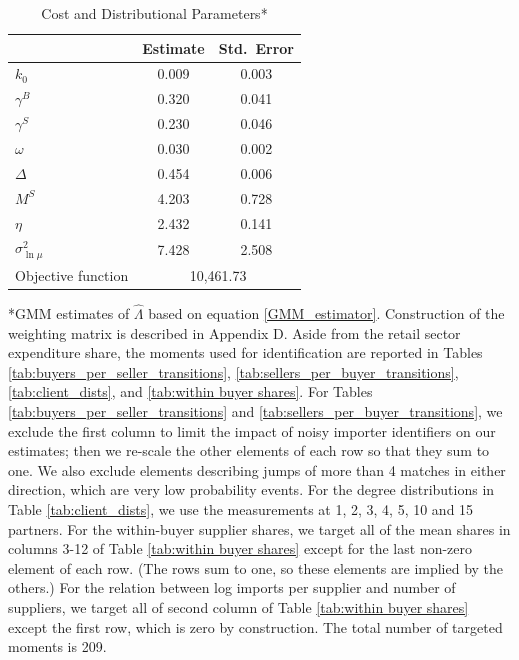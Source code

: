 \documentclass[12pt]{article} \usepackage{amsmath,amssymb,amsthm,geometry,graphicx,setspace,algorithm,algpseudocode,float}
\begin{document}
\begin{table}[htbp]
\caption{Cost and Distributional Parameters*}
\label{tab:search_cost_parameters}
\centering
\begin{tabular}{lcc}
\toprule
& Estimate & Std.\ Error \\
\midrule
$k_{0}$ & 0.009 & 0.003 \\
$\gamma ^{B}$ & 0.320 & 0.041 \\
$\gamma ^{S}$ & 0.230 & 0.046 \\
$\omega $ & 0.030 & 0.002 \\
$\Delta $ & 0.454 & 0.006 \\
$M^{S}$ & 4.203 & 0.728 \\
$\eta $ & 2.432 & 0.141 \\
$\sigma _{\ln \mu }^{2}$ & 7.428 & 2.508 \\
\midrule
Objective function & \multicolumn{2}{c}{10,461.73} \\
\bottomrule
\end{tabular}
\par\vspace{0.5em}
\begin{minipage}{\textwidth}\footnotesize
*GMM estimates of $\hat{\Lambda}$ based on equation \ref{GMM_estimator}. Construction of the weighting matrix is described in Appendix D. Aside from the retail sector expenditure share, the moments used for identification are reported in Tables \ref{tab:buyers_per_seller_transitions}, \ref{tab:sellers_per_buyer_transitions}, \ref{tab:client_dists}, and \ref{tab:within buyer shares}. For Tables \ref{tab:buyers_per_seller_transitions} and \ref{tab:sellers_per_buyer_transitions}, we exclude the first column to limit the impact of noisy importer identifiers on our estimates; then we re-scale the other elements of each row so that they sum to one. We also exclude elements describing jumps of more than 4 matches in either direction, which are very low probability events. For the degree distributions in Table \ref{tab:client_dists}, we use the measurements at 1, 2, 3, 4, 5, 10 and 15 partners. For the within-buyer supplier shares, we target all of the mean shares in columns 3-12 of Table \ref{tab:within buyer shares} except for the last non-zero element of each row. (The rows sum to one, so these elements are implied by the others.) For the relation between log imports per supplier and number of suppliers, we target all of second column of Table \ref{tab:within buyer shares} except the first row, which is zero by construction. The total number of targeted moments is 209.
\end{minipage}
\end{table}
\end{document}
